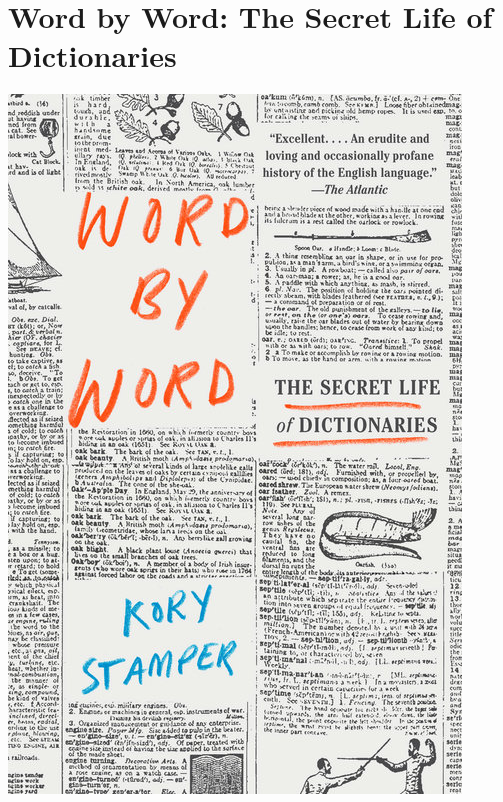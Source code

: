 \documentclass{tufte-handout}
\makeatletter
\newcommand{\varcaption}[2][0pt]{%
  \gsetlength{\@tufte@caption@vertical@offset}{-#1}%
  \gdef\@tufte@stored@varcaption{#2}%
}
\gdef\@tufte@stored@varcaption{} %
\makeatother
\begin{document}
\section*{Word by Word: The Secret Life of Dictionaries}
\begin{marginfigure}[\baselineskip]
   \includegraphics[width=\linewidth]{images/word_by_word.jpg}
   \varcaption{\href{https://www.penguinrandomhouse.com/books/530504/word-by-word-by-kory-stamper/}{Publisher Link}, \href{https://www.amazon.com/Word-Secret-Life-Dictionaries/dp/110197026X/}{Amazon Link}}
\end{marginfigure}
\end{document}
